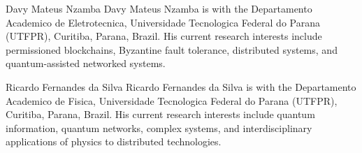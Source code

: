 \documentclass{ieeeaccess}
\begin{document}
\begin{IEEEbiographynophoto}{Davy Mateus Nzamba}
Davy Mateus Nzamba is with the Departamento Academico de Eletrotecnica, Universidade Tecnologica Federal do Parana (UTFPR), Curitiba, Parana, Brazil. His current research interests include permissioned blockchains, Byzantine fault tolerance, distributed systems, and quantum-assisted networked systems.
\end{IEEEbiographynophoto}

\begin{IEEEbiographynophoto}{Ricardo Fernandes da Silva}
Ricardo Fernandes da Silva is with the Departamento Academico de Fisica, Universidade Tecnologica Federal do Parana (UTFPR), Curitiba, Parana, Brazil. His current research interests include quantum information, quantum networks, complex systems, and interdisciplinary applications of physics to distributed technologies.
\end{IEEEbiographynophoto}

\EOD
\end{document}
